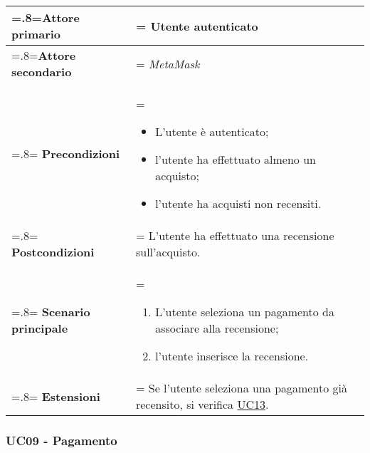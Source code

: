            \begin{center}
                \renewcommand{\arraystretch}{1.5}
                \renewcommand\tabularxcolumn[1]{m{#1}}
                \begin{tabularx}{0.9\textwidth}{
                    >{\hsize=.8\hsize\linewidth=\hsize}X
                    >{\hsize=1.2\hsize\linewidth=\hsize}X}
                    \hline
                    \textbf{Attore primario} & Utente autenticato \\
                    \hline
                    \textbf{Attore secondario} & \textit{MetaMask} \\
                    \hline
                    \textbf{Precondizioni} &
                        \begin{itemize}
                            \item L'utente è autenticato;
                            \item l'utente ha effettuato almeno un acquisto;
                            \item l'utente ha acquisti non recensiti.
                        \end{itemize} \\
                    \hline
                    \textbf{Postcondizioni} & L'utente ha effettuato una recensione sull'acquisto. \\
                    \hline
                    \textbf{Scenario principale} &
                        \begin{enumerate}
                            \item L'utente seleziona un pagamento da associare alla recensione;
                            \item l'utente inserisce la recensione.
                        \end{enumerate} \\
                    \hline
                    \textbf{Estensioni} & Se l'utente seleziona una pagamento già recensito, si verifica \hyperref[UC13]{UC13}. \\
                    \hline
                \end{tabularx}
            \end{center}

        \subsubsection{UC09 - Pagamento}
        \label{UC09}

